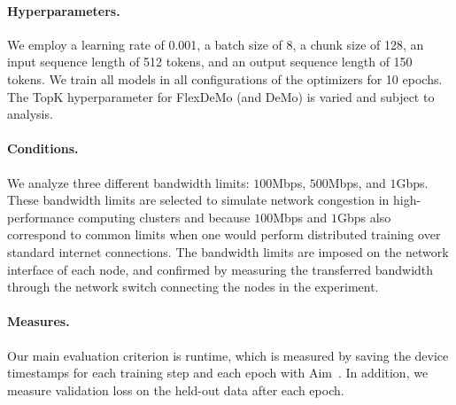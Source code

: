 \paragraph{Hyperparameters.}  We employ a learning rate of 0.001, a batch size of 8, a chunk size of 128, an input sequence length of 512 tokens, and an output sequence length of 150 tokens. 
We train all models in all configurations of the optimizers for 10 epochs. The TopK hyperparameter for FlexDeMo (and DeMo) is varied and subject to analysis.

\paragraph{Conditions.}
We analyze three different bandwidth limits: $100$Mbps, $500$Mbps, and $1$Gbps. These bandwidth limits are selected to simulate network congestion in high-performance computing clusters and because $100$Mbps and $1$Gbps also correspond to common limits when one would perform distributed training over standard internet connections. The bandwidth limits are imposed on the network interface of each node, and confirmed by measuring the transferred bandwidth through the network switch connecting the nodes in the experiment.

\paragraph{Measures.}
Our main evaluation criterion is runtime, which is measured by saving the device timestamps for each training step and each epoch with Aim~\cite{Arakelyan_Aim_2020}.
In addition, we measure validation loss on the held-out data after each epoch.
